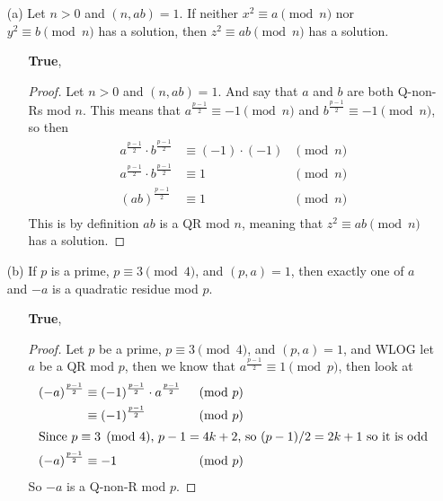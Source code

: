 \documentclass[11pt]{article}
\begin{document}
\begin{itemize}
  \item [(a)] Let $n>0$ and $(n,ab)=1$. If neither $x^2\equiv a\pmod{n}$ nor $y^2\equiv b\pmod{n}$ has a solution, then $z^2\equiv ab\pmod{n}$ has a solution.
        \begin{itemize}
          \item[\textbullet]\textbf{True},
                \begin{proof}
                  Let $n>0$ and $(n,ab)=1$. And say that $a$ and $b$ are both Q-non-Rs mod $n$. This means that $a^{\frac{p-1}{2}}\equiv -1 \pmod{n}$ and  $b^{\frac{p-1}{2}}\equiv -1 \pmod{n}$, so then
                  \begin{align*}
                    a^{\frac{p-1}{2}}\cdot b^{\frac{p-1}{2}} & \equiv (-1)\cdot(-1) & \pmod{n} \\
                    a^{\frac{p-1}{2}}\cdot b^{\frac{p-1}{2}} & \equiv 1             & \pmod{n} \\
                    (ab)^{\frac{p-1}{2}}                     & \equiv 1             & \pmod{n} \\
                  \end{align*}
                  This is by definition $ab$ is a QR mod $n$, meaning that $z^2\equiv ab\pmod{n}$ has a solution.
                \end{proof}
        \end{itemize}
  \item [(b)] If $p$ is a prime, $p\equiv 3\pmod{4}$, and $(p,a)=1$, then exactly one of $a$ and $-a$ is a quadratic residue mod $p$.
        \begin{itemize}
          \item[\textbullet]\textbf{True},

                \begin{proof}
                  Let $p$ be a prime, $p\equiv 3\pmod{4}$, and $(p,a)=1$, and WLOG let $a$ be a QR mod $p$, then we know that $a^{\frac{p-1}{2}} \equiv 1 \pmod{p}$, then look at
                  \begin{align*}
                    (-a)^{\frac{p-1}{2}} & \equiv (-1)^{\frac{p-1}{2}} \cdot a^{\frac{p-1}{2}} & \pmod{p} \\
                                         & \equiv (-1)^{\frac{p-1}{2}}                         & \pmod{p} \\
                    \intertext{Since $p\equiv 3\pmod{4}$, $p-1=4k+2$, so $(p-1)/2=2k+1$ so it is odd}
                    (-a)^{\frac{p-1}{2}} & \equiv -1                                           & \pmod{p} \\
                  \end{align*}
                  So $-a$ is a Q-non-R mod $p$.


\end{proof}
\end{itemize}
\end{itemize}
\end{document}
